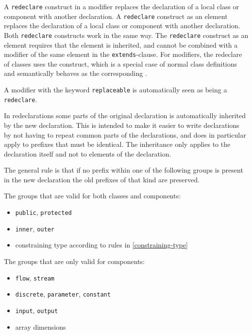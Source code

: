 A \lstinline!redeclare! construct in a modifier replaces the declaration of a local class or component with another declaration.
A \lstinline!redeclare! construct as an element replaces the declaration of a local class or component with another declaration.
Both \lstinline!redeclare! constructs work in the same way.
The \lstinline!redeclare! construct as an element requires that the element is inherited, and cannot be combined with a modifier of the same element in the \lstinline!extends!-clause.
For modifiers, the redeclare of classes uses the  construct, which is a special case of normal class definitions and semantically behaves as the corresponding .

A modifier with the keyword \lstinline!replaceable! is automatically seen as being a \lstinline!redeclare!.

In redeclarations some parts of the original declaration is automatically inherited by the new declaration.
This is intended to make it easier to write declarations by not having to repeat common parts of the declarations, and does in particular apply to prefixes that must be identical.
The inheritance only applies to the declaration itself and not to elements of the declaration.

The general rule is that if no prefix within one of the following groups is present in the new declaration the old prefixes of that kind are preserved.

The groups that are valid for both classes and components:
\begin{itemize}
\item
  \lstinline!public!, \lstinline!protected!
\item
  \lstinline!inner!, \lstinline!outer!
\item
  constraining type according to rules in \cref{constraining-type}
\end{itemize}

The groups that are only valid for components:
\begin{itemize}
\item
  \lstinline!flow!, \lstinline!stream!
\item
  \lstinline!discrete!, \lstinline!parameter!, \lstinline!constant!
\item
  \lstinline!input!, \lstinline!output!
\item
  array dimensions
\end{itemize}

